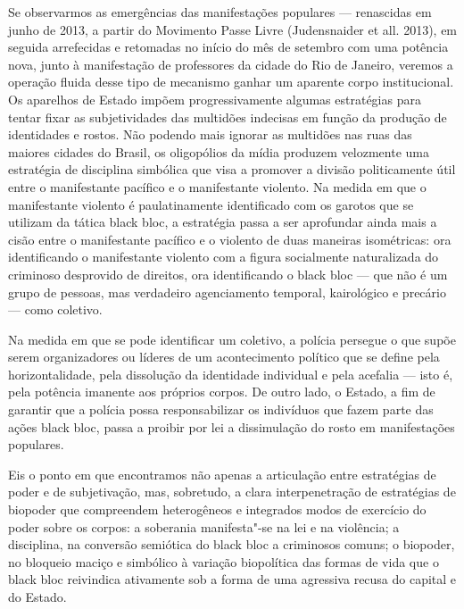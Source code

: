 Se observarmos as emergências das manifestações populares --- renascidas
em junho de 2013, a partir do Movimento Passe Livre (Judensnaider et
all. 2013), em seguida arrefecidas e retomadas no início do mês de
setembro com uma potência nova, junto à manifestação de professores da
cidade do Rio de Janeiro, veremos a operação fluida desse tipo de
mecanismo ganhar um aparente corpo institucional. Os aparelhos de Estado
impõem progressivamente algumas estratégias para tentar fixar as
subjetividades das multidões indecisas em função da produção de
identidades e rostos. Não podendo mais ignorar as multidões nas ruas das
maiores cidades do Brasil, os oligopólios da mídia produzem velozmente
uma estratégia de disciplina simbólica que visa a promover a divisão
politicamente útil entre o manifestante pacífico e o manifestante
violento. Na medida em que o manifestante violento é paulatinamente
identificado com os garotos que se utilizam da tática black bloc, a
estratégia passa a ser aprofundar ainda mais a cisão entre o
manifestante pacífico e o violento de duas maneiras isométricas: ora
identificando o manifestante violento com a figura socialmente
naturalizada do criminoso desprovido de direitos, ora identificando o
black bloc --- que não é um grupo de pessoas, mas verdadeiro agenciamento
temporal, kairológico e precário --- como coletivo.

Na medida em que se pode identificar um coletivo, a polícia persegue o
que supõe serem organizadores ou líderes de um acontecimento político
que se define pela horizontalidade, pela dissolução da identidade
individual e pela acefalia --- isto é, pela potência imanente aos
próprios corpos. De outro lado, o Estado, a fim de garantir que a
polícia possa responsabilizar os indivíduos que fazem parte das ações
black bloc, passa a proibir por lei a dissimulação do rosto em
manifestações populares.

Eis o ponto em que encontramos não apenas a articulação entre
estratégias de poder e de subjetivação, mas, sobretudo, a clara
interpenetração de estratégias de biopoder que compreendem heterogêneos
e integrados modos de exercício do poder sobre os corpos: a soberania
manifesta"-se na lei e na violência; a disciplina, na conversão semiótica
do black bloc a criminosos comuns; o biopoder, no bloqueio maciço e
simbólico à variação biopolítica das formas de vida que o black bloc
reivindica ativamente sob a forma de uma agressiva recusa do capital e
do Estado.

